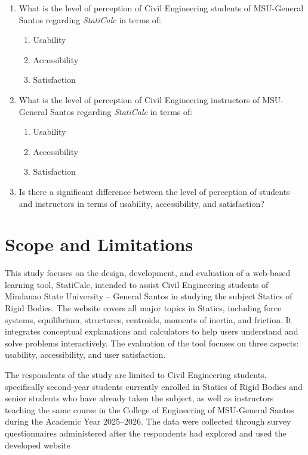 \begin{enumerate}
    \item What is the level of perception of Civil Engineering students of MSU-General Santos regarding \textit{StatiCalc} in terms of:
    \begin{enumerate}[label*=\alph*.]
        \item Usability
        \item Accessibility
        \item Satisfaction
    \end{enumerate}

    \item What is the level of perception of Civil Engineering instructors of MSU-General Santos regarding \textit{StatiCalc} in terms of:
    \begin{enumerate}[label*=\alph*.]
        \item Usability
        \item Accessibility
        \item Satisfaction
    \end{enumerate}

    \item Is there a significant difference between the level of perception of students and instructors in terms of usability, accessibility, and satisfaction?
\end{enumerate}

\section{Scope and Limitations}\label{sec:1-sal}
This study focuses on the design, development, and evaluation of a web-based learning tool, StatiCalc, intended to assist Civil Engineering students of Mindanao State University – General Santos in studying the subject Statics of Rigid Bodies. The website covers all major topics in Statics, including force systems, equilibrium, structures, centroids, moments of inertia, and friction. It integrates conceptual explanations and calculators to help users understand and solve problems interactively. The evaluation of the tool focuses on three aspects: usability, accessibility, and user satisfaction.

The respondents of the study are limited to Civil Engineering students, specifically second-year students currently enrolled in Statics of Rigid Bodies and senior students who have already taken the subject, as well as instructors teaching the same course in the College of Engineering of MSU-General Santos during the Academic Year 2025–2026. The data were collected through survey questionnaires administered after the respondents had explored and used the developed website

